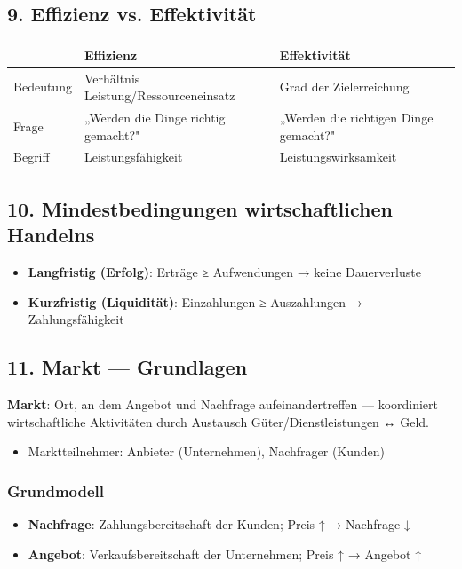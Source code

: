 \documentclass[11pt, a4paper]{article}
\begin{document}
\subsection{9. Effizienz vs. Effektivität}


{\small
\begin{tabularx}{\linewidth}{XXX}
\hline
\rowcolor{tableheadbg}
{\color{white}\textbf{}} & {\color{white}\textbf{Effizienz}} & {\color{white}\textbf{Effektivität}} \\[2pt]
\hline
\endhead
\hline
\endfoot
Bedeutung & Verhältnis Leistung/Ressourceneinsatz & Grad der Zielerreichung \\
Frage & „Werden die Dinge richtig gemacht?" & „Werden die richtigen Dinge gemacht?" \\
Begriff & Leistungsfähigkeit & Leistungswirksamkeit \\
\end{tabularx}
}



\subsection{10. Mindestbedingungen wirtschaftlichen Handelns}

\begin{itemize}
  \item \textbf{Langfristig (Erfolg)}: Erträge ≥ Aufwendungen → keine Dauerverluste
  \item \textbf{Kurzfristig (Liquidität)}: Einzahlungen ≥ Auszahlungen → Zahlungsfähigkeit
\end{itemize}


\subsection{11. Markt — Grundlagen}

\textbf{Markt}: Ort, an dem Angebot und Nachfrage aufeinandertreffen — koordiniert wirtschaftliche Aktivitäten durch Austausch Güter/Dienstleistungen ↔ Geld.

\begin{itemize}
  \item Marktteilnehmer: Anbieter (Unternehmen), Nachfrager (Kunden)
\end{itemize}


\subsubsection{Grundmodell}
\begin{itemize}
  \item \textbf{Nachfrage}: Zahlungsbereitschaft der Kunden; Preis ↑ → Nachfrage ↓
  \item \textbf{Angebot}: Verkaufsbereitschaft der Unternehmen; Preis ↑ → Angebot ↑
\end{itemize}
\end{document}
